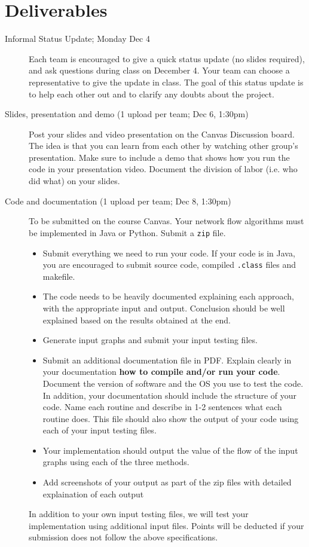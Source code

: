 \documentclass[11pt]{article}
\begin{document}
\section{Deliverables}
\begin{description}
\item [Informal Status Update; Monday Dec 4] Each team is encouraged to give a quick status update (no slides required), and ask questions during class on December 4. Your team can choose a representative to give the update in class. The goal of this status update is to help each other out and to clarify any doubts about the project.

\item [Slides, presentation and demo (1 upload per team; Dec 6, 1:30pm)] Post your slides and video presentation on the Canvas Discussion board. The idea is that you can learn from each other by watching other group's presentation.  Make sure to include a demo that shows how you run the code in your presentation video. Document the division of labor (i.e. who did what) on your slides.

\item [Code and documentation (1 upload per team; Dec 8, 1:30pm)] To be submitted on the course Canvas.  Your network flow algorithms must be implemented in Java or Python.   Submit a {\tt zip} file.
\begin{itemize}
\item Submit everything we need to run your code. If your code is in Java, you are encouraged to submit source code, compiled {\tt .class} files and makefile.  
\item The code needs to be heavily documented explaining each approach, with the appropriate input and output. Conclusion should be well explained based on the results obtained at the end.
\item Generate input graphs and submit your input testing files.
\item Submit an additional documentation file in PDF. Explain clearly in your documentation {\bf how to compile and/or run your code}. Document the version of software and the OS you use to test the code. In addition, your documentation should include the structure of your code. Name each routine and describe in 1-2 sentences what each routine does.  This file should also show the output of your code using each of your input testing files.
\item Your implementation should output the value of the flow of the input graphs using each of the three methods.
\item Add screenshots of your output as part of the zip files with detailed explaination of each output
\end{itemize}
In addition to your own input testing files, we will test your implementation using additional input files.  Points will be deducted if  your submission does not follow the above specifications.


\end{description}
\end{document}
